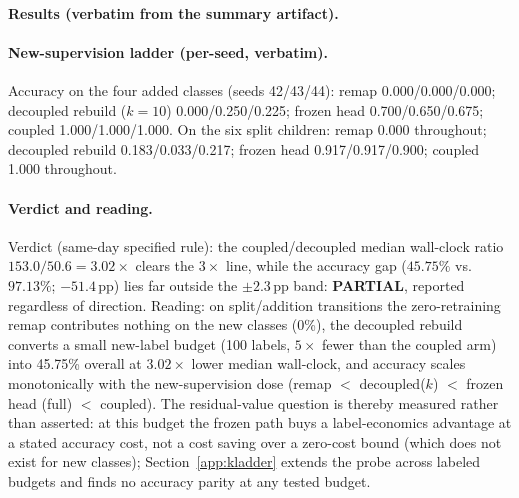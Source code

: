 \documentclass[11pt,a4paper]{article}
\begin{document}
\paragraph{Results (verbatim from the summary artifact).}
\begin{center}
%
\end{center}

\paragraph{New-supervision ladder (per-seed, verbatim).}
Accuracy on the four added classes (seeds 42/43/44): remap 0.000/0.000/0.000; decoupled rebuild ($k{=}10$) 0.000/0.250/0.225; frozen head 0.700/0.650/0.675; coupled 1.000/1.000/1.000. On the six split children: remap 0.000 throughout; decoupled rebuild 0.183/0.033/0.217; frozen head 0.917/0.917/0.900; coupled 1.000 throughout.

\paragraph{Verdict and reading.}
Verdict (same-day specified rule): the coupled/decoupled median wall-clock ratio $153.0/50.6 = 3.02\times$ clears the $3\times$ line, while the accuracy gap ($45.75\%$ vs.\ $97.13\%$; $-51.4$\,pp) lies far outside the $\pm2.3$\,pp band: \textbf{PARTIAL}, reported regardless of direction. Reading: on split/addition transitions the zero-retraining remap contributes nothing on the new classes (0\%), the decoupled rebuild converts a small new-label budget (100 labels, $5\times$ fewer than the coupled arm) into 45.75\% overall at $3.02\times$ lower median wall-clock, and accuracy scales monotonically with the new-supervision dose (remap $<$ decoupled($k$) $<$ frozen head (full) $<$ coupled). The residual-value question is thereby measured rather than asserted: at this budget the frozen path buys a label-economics advantage at a stated accuracy cost, not a cost saving over a zero-cost bound (which does not exist for new classes); Section~\ref{app:kladder} extends the probe across labeled budgets and finds no accuracy parity at any tested budget.
\end{document}
